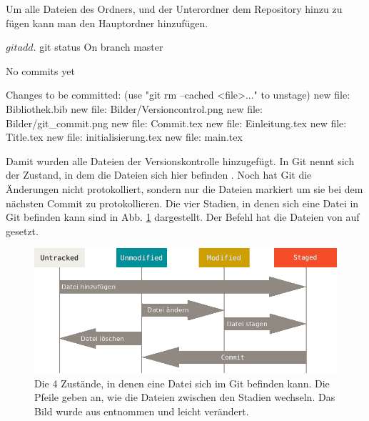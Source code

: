 Um alle Dateien des Ordners, und der Unterordner dem Repository hinzu zu fügen kann man den Hauptordner hinzufügen.
\begin{mplisting}
$ git add .
$ git status
On branch master

No commits yet

Changes to be committed:
  (use "git rm --cached <file>..." to unstage)
	new file:   Bibliothek.bib
	new file:   Bilder/Versioncontrol.png
	new file:   Bilder/git_commit.png
	new file:   Commit.tex
	new file:   Einleitung.tex
	new file:   Title.tex
	new file:   initialisierung.tex
	new file:   main.tex

\end{mplisting}
Damit wurden alle Dateien der Versionskontrolle hinzugefügt. In Git nennt sich der Zustand, in dem die Dateien sich hier befinden . Noch hat Git die Änderungen nicht protokolliert, sondern nur die Dateien markiert um sie bei dem nächsten Commit zu protokollieren. Die vier Stadien, in denen sich eine Datei in Git befinden kann sind in Abb. \ref{fig:lifecycle} dargestellt. Der  Befehl hat die Dateien von  auf  gesetzt.
\begin{figure}[!h]
    \centering
    \includegraphics[width=\textwidth]{Bilder/lifecycle_de.png}
    \caption{Die 4 Zustände, in denen eine Datei sich im Git befinden kann. Die Pfeile geben an, wie die Dateien zwischen den Stadien wechseln. Das Bild wurde aus \cite{ProGit} entnommen und leicht verändert.}
    \label{fig:lifecycle}
\end{figure}
